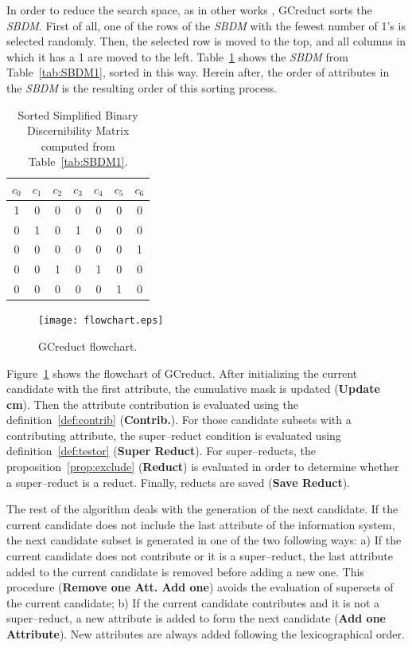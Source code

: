 \documentclass[number,preprint,review,12pt]{elsarticle}
\begin{document}
	In order to reduce the search space, as in other works \citep{Sanchez07,Lias13}, GCreduct sorts the \textit{SBDM}. First of all, one of the rows of the \textit{SBDM} with the fewest number of 1's is selected randomly. Then, the selected row is moved to the top, and all columns in which it has a 1 are moved to the left. Table~\ref{tab:SSBDM1} shows the \textit{SBDM} from Table~\ref{tab:SBDM1}, sorted in this way. Herein after, the order of attributes in the \textit{SBDM} is the resulting order of this sorting process.
		
	\begin{table}[htb]
		\caption{Sorted Simplified Binary Discernibility Matrix computed from Table~\ref{tab:SBDM1}.}
		\centering
		\begin{tabular}{ccccccc}\label{tab:SSBDM1}
			$c_0$ & $c_1$ & $c_2$ & $c_3$ & $c_4$ & $c_5$ & $c_6$\\
			\hline
			1&0&0&0&0&0&0\\
			0&1&0&1&0&0&0\\
			0&0&0&0&0&0&1\\
			0&0&1&0&1&0&0\\
			0&0&0&0&0&1&0\\
		\end{tabular}             
	\end{table}  
	
	\begin{figure}[htb]
		\begin{center}
			\texttt{[image: flowchart.eps]}
		\end{center}
		\caption{GCreduct flowchart.}
		\label{fig:flowchart}
	\end{figure}
	
	Figure~\ref{fig:flowchart} shows the flowchart of GCreduct. After initializing the current candidate with the first attribute, the cumulative mask is updated (\textbf{Update cm}). Then the attribute contribution is evaluated using the definition~\ref{def:contrib} (\textbf{Contrib.}). For those candidate subsets with a contributing attribute, the super--reduct condition is evaluated using definition~\ref{def:testor} (\textbf{Super Reduct}). For super--reducts, the proposition~\ref{prop:exclude} (\textbf{Reduct}) is evaluated in order to determine whether a super--reduct is a reduct. Finally, reducts are saved (\textbf{Save Reduct}).
	
	The rest of the algorithm deals with the generation of the next candidate. If the current candidate does not include the last attribute of the information system, the next candidate subset is generated in one of the two following ways: a) If the current candidate does not contribute or it is a super--reduct, the last attribute added to the current candidate is removed before adding a new one. This procedure (\textbf{Remove one Att. Add one}) avoids the evaluation of supersets of the current candidate; b) If the current candidate contributes and it is not a super--reduct, a new attribute is added to form the next candidate (\textbf{Add one Attribute}). New attributes are always added following the lexicographical order. 
	
\end{document}
